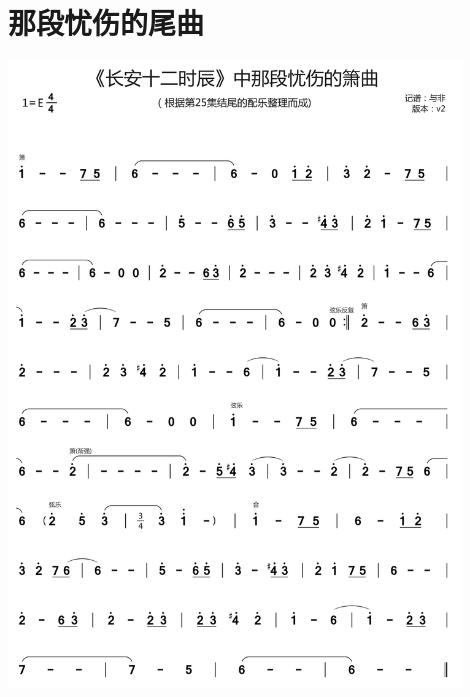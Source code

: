 \documentclass[cn,pad,twocol]{elegantbook}
\begin{document}
\section{那段忧伤的尾曲}  \includegraphics[width=0.9\textwidth]{rpi400/20210127长安十二时辰25集尾曲.jpg}
\end{document}
